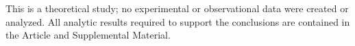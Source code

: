 This is a theoretical study; no experimental or observational data were created or analyzed. All analytic results required to support the conclusions are contained in the Article and Supplemental Material.
